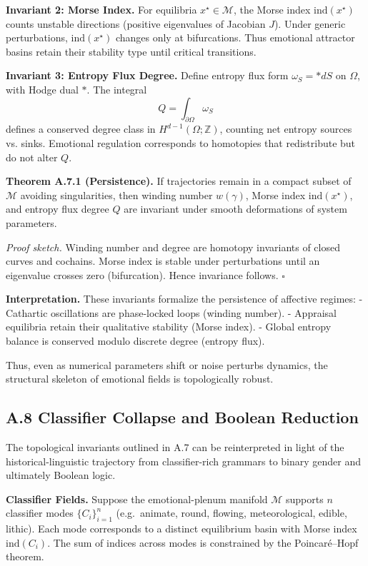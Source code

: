 \documentclass[11pt]{article}
\theoremstyle{plain}
\begin{document}
\textbf{Invariant 2: Morse Index.}  
For equilibria $x^\star\in\mathcal{M}$, the Morse index
$\mathrm{ind}(x^\star)$ counts unstable directions (positive eigenvalues of
Jacobian $J$). Under generic perturbations, $\mathrm{ind}(x^\star)$ changes
only at bifurcations. Thus emotional attractor basins retain their stability
type until critical transitions.

\textbf{Invariant 3: Entropy Flux Degree.}  
Define entropy flux form
$\omega_S = \ast dS$ on $\Omega$, with Hodge dual $\ast$. The integral
\[
Q = \int_{\partial \Omega} \omega_S
\]
defines a conserved degree class in $H^{d-1}(\Omega;\mathbb{Z})$, counting net
entropy sources vs. sinks. Emotional regulation corresponds to homotopies
that redistribute but do not alter $Q$.

\textbf{Theorem A.7.1 (Persistence).}  
If trajectories remain in a compact subset of $\mathcal{M}$ avoiding
singularities, then winding number $w(\gamma)$, Morse index
$\mathrm{ind}(x^\star)$, and entropy flux degree $Q$ are invariant under
smooth deformations of system parameters.  

\emph{Proof sketch.}  
Winding number and degree are homotopy invariants of closed curves and
cochains. Morse index is stable under perturbations until an eigenvalue crosses
zero (bifurcation). Hence invariance follows. $\square$

\medskip

\textbf{Interpretation.}  
These invariants formalize the persistence of affective regimes:  
- Cathartic oscillations are phase-locked loops (winding number).  
- Appraisal equilibria retain their qualitative stability (Morse index).  
- Global entropy balance is conserved modulo discrete degree (entropy flux).  

Thus, even as numerical parameters shift or noise perturbs dynamics, the
structural skeleton of emotional fields is topologically robust.

\subsection*{A.8 Classifier Collapse and Boolean Reduction}

The topological invariants outlined in A.7 can be reinterpreted in light of
the historical-linguistic trajectory from classifier-rich grammars to binary
gender and ultimately Boolean logic.

\textbf{Classifier Fields.}  
Suppose the emotional-plenum manifold $\mathcal{M}$ supports $n$ classifier
modes $\{C_i\}_{i=1}^n$ (e.g.\ animate, round, flowing, meteorological,
edible, lithic). Each mode corresponds to a distinct equilibrium basin with
Morse index $\mathrm{ind}(C_i)$. The sum of indices across modes is
constrained by the Poincaré–Hopf theorem.
\end{document}
